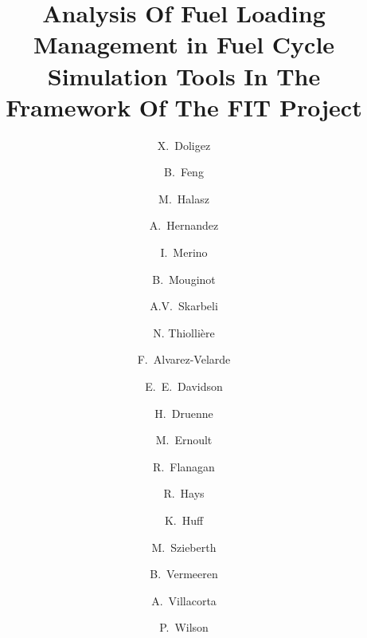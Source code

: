\documentclass[review]{elsarticle}
\begin{document}
\begin{frontmatter}

\title{Analysis Of Fuel Loading Management in Fuel Cycle Simulation Tools In The Framework Of The FIT Project}



\author[IPNO]{X.~Doligez}
\author[ANL]{B.~Feng}
\author[BUD]{M.~Halasz}
\author[SCK]{A.~Hernandez}
\author[MAULE]{I.~Merino}
\author[MAD]{B.~Mouginot}
\author[CIEMAT]{A.V.~Skarbeli}

\author[SUB]{N. Thiolli\`ere }

\author[CIEMAT]{F.~Alvarez-Velarde}
\author[ORNL]{E.~E.~Davidson}
\author[TRACT]{H.~Druenne}
\author[IPNO]{M.~Ernoult}
\author[USC]{R.~Flanagan}
\author[INL]{R.~Hays}
\author[UI]{K.~Huff}
\author[BUD]{M.~Szieberth}
\author[TRACT]{B.~Vermeeren}
\author[CIEMAT]{A.~Villacorta}
\author[MAD]{P.~Wilson}


\address[IPNO]{Institut de Physique Nucléaire d’Orsay, CNRS-IN2P3/Univ, Paris-Sud, France}
\address[ANL]{Argonne National Laboratory, 9700 Cass Ave., Lemont, IL 60439, USA}
\address[BUD]{Budapest University of Technology and Economics (BME), Institute of Nuclear Techniques, 1111 Budapest, Müegyetem rkp. 3-9, Hungary}
\address[SCK]{Studiecentrum voor kernenergie - Centre d'étude de l'énergie nucléaire (SCK-CEN), Boeretang 200, Mol, Belgium}
\address[MAULE]{Catholic University of the Maule, Av. San Miguel 3605, Talca, Chile}
\address[MAD]{Univ. of Wisconsin Madison, Department of Nuclear Engineering and Engineering Physics, Madison, WI, United States}
\address[SUB]{Subatech, IMTA-IN2P3/CNRS-Universit\'e, Nantes, F-44307, France}
\address[ORNL]{Oak Ridge National Laboratory, Building 5700, Mail Stop 6172, Oak Ridge, TN 37831, United States}
\address[TRACT]{Tractebel Engie, Boulevard Simón Bolívar 34-36, 1000 Brussels, Belgium}
\address[USC]{University of South Carolina, Nuclear Engineering Program, Columbia, SC 29201, United States}
\address[INL]{Idaho National Laboratory, 2525 Fremont Ave., Idaho Falls, ID 83402, USA}
\address[UI]{University of Illinois, Department of Nuclear, Plasma, and Radiological Engineering, United States}
\address[CIEMAT]{CIEMAT, Avda. Complutense, 40, 28040 Madrid, Spain}


\end{frontmatter}
\end{document}
